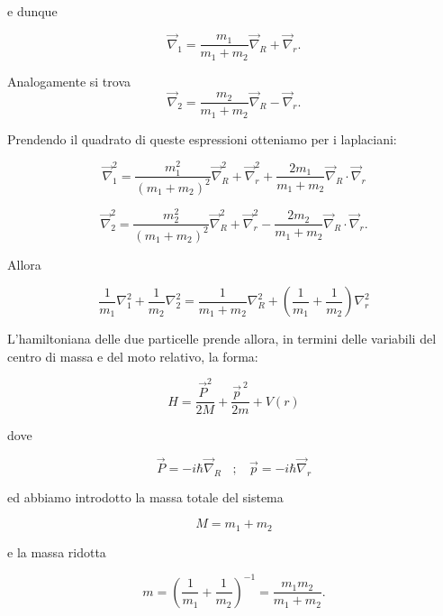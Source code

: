 e dunque

\begin{equation}
\vec{\nabla}_1=\frac{m_1}{m_1+m_2}\vec{\nabla}_R+\vec{\nabla}_r.
\end{equation}

Analogamente si trova
\begin{equation}
\vec{\nabla}_2=\frac{m_2}{m_1+m_2}\vec{\nabla}_R-\vec{\nabla}_r.
\end{equation}

Prendendo il quadrato di queste espressioni otteniamo per i laplaciani:

\begin{equation}
\vec{\nabla}_1^2=\frac{m_1^2}{\left(m_1+m_2\right)^2}\vec{\nabla}_R^2+\vec{\nabla}_r^2+\frac{2m_1}{m_1+m_2}\vec{\nabla}_R\cdot\vec{\nabla}_r
\end{equation}

\begin{equation}
\vec{\nabla}_2^2=\frac{m_2^2}{\left(m_1+m_2\right)^2}\vec{\nabla}_R^2+\vec{\nabla}_r^2-\frac{2m_2}{m_1+m_2}\vec{\nabla}_R\cdot\vec{\nabla}_r.
\end{equation}

Allora

\begin{equation}
\frac{1}{m_1}\nabla_1^2+\frac{1}{m_2}\nabla_2^2=\frac{1}{m_1+m_2}\nabla_R^2+\left(\frac{1}{m_1}+\frac{1}{m_2}\right)\nabla_r^2
\end{equation}

L'hamiltoniana delle due particelle prende allora, in termini delle variabili del centro di massa e del moto relativo, la forma:

\begin{equation}
H=\frac{\vec{P}^{2}}{2M}+\frac{\vec{p}^{\ 2}}{2m}+V\left(r\right)
\end{equation}

dove

\begin{equation}
\vec{P}=-i\hbar\vec{\nabla}_R \ \ \ \ ;\ \ \ \ \vec{p}=-i\hbar\vec{\nabla}_r
\end{equation}

ed abbiamo introdotto la massa totale del sistema

\begin{equation}
M=m_1+m_2
\end{equation}

e la massa ridotta

\begin{equation}
m=\left(\frac{1}{m_1}+\frac{1}{m_2}\right)^{-1}=\frac{m_1m_2}{m_1+m_2}.
\end{equation}


